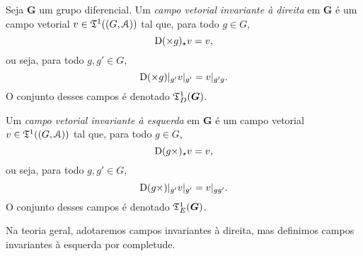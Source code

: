 \begin{definition}
Seja $\bm G$ um grupo diferencial. Um \emph{campo vetorial invariante à direita} em $\bm G$ é um campo vetorial $v \in \mathfrak{T}^1((G,\mathcal{A}))$ tal que, para todo $g \in G$,
	\begin{equation*}
	\mathrm{D}(\times g)_\star v = v,
	\end{equation*}
ou seja, para todo $g,g' \in G$,
	\begin{equation*}
	\mathrm{D}(\times g)|_{g'} v|_{g'} = v|_{g'g}.
	\end{equation*}
O conjunto desses campos é denotado $\mathfrak{T}^1_D(\bm G)$.

Um \emph{campo vetorial invariante à esquerda} em $\bm G$ é um campo vetorial $v \in \mathfrak{T}^1((G,\mathcal{A}))$ tal que, para todo $g \in G$,
	\begin{equation*}
	\mathrm{D}(g \times)_\star v = v,
	\end{equation*}
ou seja, para todo $g,g' \in G$,
	\begin{equation*}
	\mathrm{D}(g \times)|_{g'} v|_{g'} = v|_{gg'}.
	\end{equation*}
O conjunto desses campos é denotado $\mathfrak{T}^1_E(\bm G)$.
\end{definition}

Na teoria geral, adotaremos campos invariantes à direita, mas definimos campos invariantes à esquerda por completude.

